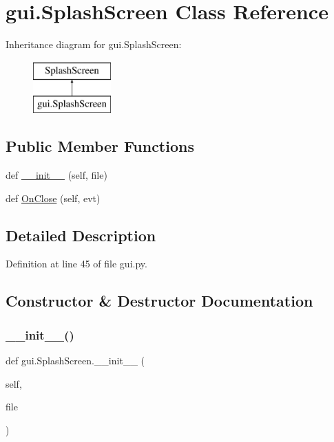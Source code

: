 \hypertarget{classgui_1_1SplashScreen}{}\section{gui.\+Splash\+Screen Class Reference}
\label{classgui_1_1SplashScreen}
Inheritance diagram for gui.\+Splash\+Screen\+:\begin{figure}[H]
\begin{center}
\leavevmode
\includegraphics[height=2.000000cm]{classgui_1_1SplashScreen}
\end{center}
\end{figure}
\subsection*{Public Member Functions}
\begin{DoxyCompactItemize}
\item 
def \hyperlink{classgui_1_1SplashScreen_a411d1bed7464fb12e7dd682de7ca9084}{\+\_\+\+\_\+init\+\_\+\+\_\+} (self, file)
\item 
def \hyperlink{classgui_1_1SplashScreen_a2688263042c784a3d7cb7947fabe0edb}{On\+Close} (self, evt)
\end{DoxyCompactItemize}


\subsection{Detailed Description}


Definition at line 45 of file gui.\+py.



\subsection{Constructor \& Destructor Documentation}
\mbox{\label{classgui_1_1SplashScreen_a411d1bed7464fb12e7dd682de7ca9084}} 
\subsubsection{\texorpdfstring{\+\_\+\+\_\+init\+\_\+\+\_\+()}{\_\_init\_\_()}}
{\footnotesize\ttfamily def gui.\+Splash\+Screen.\+\_\+\+\_\+init\+\_\+\+\_\+ (\begin{DoxyParamCaption}\item[{}]{self,  }\item[{}]{file }\end{DoxyParamCaption})}



